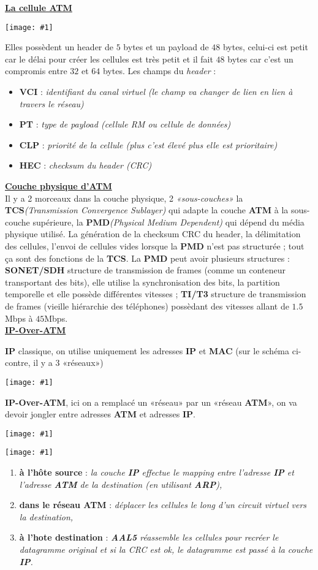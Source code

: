 \documentclass{article}
\newcommand{\imgR}[2]{\begin{center}\texttt{[image: \#1]}\end{center}}
\newcommand{\bfp}[2]{\item \textbf{#1} : \textit{#2}}
\newcommand{\stitre}[1]{\noindent\textbf{\underline{#1}} \\}
\begin{document}
\stitre{La cellule ATM}

\imgR{CN_132.png}{275}

Elles possèdent un header de $5$ bytes et un payload de $48$ bytes, celui-ci est petit car le délai pour créer 
les cellules est très petit et il fait $48$ bytes car c'est un compromis entre $32$ et $64$ bytes. Les champs du 
\textit{header} :
\begin{itemize}
\bfp{VCI}{identifiant du canal virtuel (le champ va changer de lien en lien à travers le réseau)}
\bfp{PT}{type de payload (cellule \textit{RM} ou cellule de données)}
\bfp{CLP}{priorité de la cellule (plus c'est élevé plus elle est prioritaire)}
\bfp{HEC}{checksum du header (CRC)} \\
\end{itemize}

\stitre{Couche physique d'ATM}

Il y a 2 morceaux dans la couche physique, 2 \textit{«sous-couches»} la \textbf{TCS}\textit{(Transmission 
Convergence Sublayer)} qui adapte la couche \textbf{ATM} à la sous-couche supérieure, la 
\textbf{PMD}\textit{(Physical Medium Dependent)} qui dépend du média physique utilisé. La génération de la 
checksum CRC du header, la délimitation des cellules, l'envoi de cellules vides lorsque la \textbf{PMD} n'est
pas structurée ; tout ça sont des fonctions de la \textbf{TCS}. La \textbf{PMD} peut avoir plusieurs structures :
\textbf{SONET/SDH} structure de transmission de frames (comme un conteneur transportant des bits), elle utilise 
la synchronisation des bits, la partition temporelle et elle possède différentes vitesses ; \textbf{TI/T3} 
structure de transmission de frames (vieille hiérarchie des téléphones) possèdant des vitesses allant de 
$1.5$Mbps à $45$Mbps. \\

\stitre{IP-Over-ATM}

\begin{multicols}{2}
\textbf{IP} classique, on utilise uniquement les adresses \textbf{IP} et \textbf{MAC} (sur le schéma ci-contre,
il y a $3$ «réseaux»)
\imgR{CN_133.png}{70}
\end{multicols}

\begin{multicols}{2}
\textbf{IP-Over-ATM}, ici on a remplacé un «réseau» par un «réseau \textbf{ATM}», on va devoir jongler entre 
adresses \textbf{ATM} et adresses \textbf{IP}.
\imgR{CN_134.png}{100}
\end{multicols}

\begin{multicols}{2}
\imgR{CN_135.png}{225}
\begin{enumerate}
\bfp{à l'hôte source}{la couche \textbf{IP} effectue le mapping entre l'adresse \textbf{IP} et l'adresse 
\textbf{ATM} de la destination (en utilisant \textbf{ARP}),}
\bfp{dans le réseau ATM}{déplacer les cellules le long d'un circuit virtuel vers la destination,}
\bfp{à l'hote destination}{\textbf{AAL5} réassemble les cellules pour recréer le datagramme original et si la CRC
est ok, le datagramme est passé à la couche \textbf{IP}.} \\
\end{enumerate}
\end{multicols}
\end{document}
